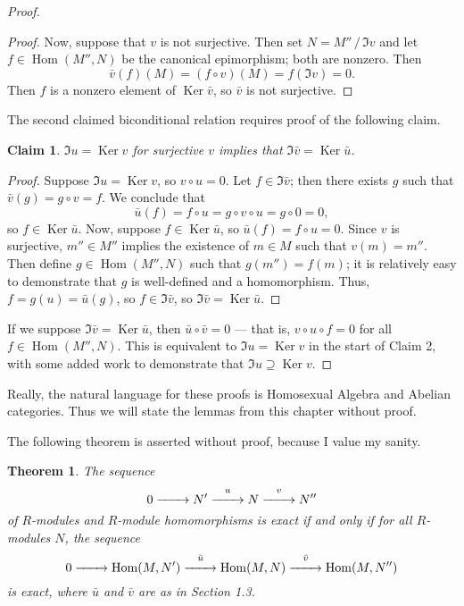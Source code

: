 \documentclass[11pt]{article}
\newtheorem{theorem}{Theorem}
\newtheorem{claim}{Claim}
\newcommand{\Hom}{\operatorname{Hom}}
\newcommand{\Ker}{\operatorname{Ker}}
\renewcommand{\longrightarrow}{\xrightarrow{\hspace*{0.7cm}}}
\begin{document}
\begin{adjustwidth}{0.5cm}{}
\begin{proof}
\begin{adjustwidth}{0.5cm}{}
\begin{proof}
				Now, suppose that $v$ is not surjective. Then set $N = M'' \,/\, \Im v$ and let $f \in \Hom(M'', N)$ be the canonical epimorphism; both are nonzero. Then
				\[
					\bar{v}(f)(M) = (f \circ v)(M) = f(\Im v) = 0.
				\]
				Then $f$ is a nonzero element of $\Ker \bar{v}$, so $\bar{v}$ is not surjective.
			\end{proof}
		\end{adjustwidth}
		The second claimed biconditional relation requires proof of the following claim.
		\begin{adjustwidth}{0.5cm}{}
			\begin{claim}
				$\Im u = \Ker v$ for surjective $v$ implies that $\Im \bar{v} = \Ker \bar{u}$.
			\end{claim}
			\begin{proof}\renewcommand{\qedsymbol}{}
				Suppose $\Im u = \Ker v$, so $v \circ u = 0$. Let $f \in \Im \bar{v}$; then there exists $g$ such that $\bar{v}(g) = g \circ v = f$. We conclude that
				\[
					\bar{u}(f) = f \circ u = g \circ v \circ u = g \circ 0 = 0,
				\]
				so $f \in \Ker \bar{u}$. Now, suppose $f \in \Ker \bar{u}$, so $\bar{u}(f) = f \circ u = 0$. Since $v$ is surjective, $m'' \in M''$ implies the existence of $m \in M$ such that $v(m) = m''$. Then define $g \in \Hom(M'', N)$ such that $g(m'') = f(m)$; it is relatively easy to demonstrate that $g$ is well-defined and a homomorphism. Thus, $f = g(u) = \bar{u}(g)$, so $f \in \Im \bar{v}$, so $\Im \bar{v} = \Ker \bar{u}$.
			\end{proof}
		\end{adjustwidth}
		If we suppose $\Im \bar{v} = \Ker \bar{u}$, then $\bar{u} \circ \bar{v} = 0$ --- that is, $v \circ u \circ f = 0$ for all $f \in \Hom(M'', N)$. This is equivalent to $\Im u = \Ker v$ in the start of Claim 2, with some added work to demonstrate that $\Im u \supseteq \Ker v$.
	\end{proof}
\end{adjustwidth}

Really, the natural language for these proofs is Homosexual Algebra and Abelian categories. Thus we will state the lemmas from this chapter without proof.

\newpage

The following theorem is asserted without proof, because I value my sanity.

\begin{adjustwidth}{0.5cm}{}
  \begin{theorem}
		The sequence
		\[
			0 \longrightarrow N' \stackrel{u}{\longrightarrow} N \stackrel{v}{\longrightarrow} N''
    \]
		of $R$-modules and $R$-module homomorphisms is exact if and only if for all $R$-modules $N$, the sequence
		\[
			0 \longrightarrow \Hom(M, N') \stackrel{\bar{u}}{\longrightarrow} \Hom(M, N) \stackrel{\bar{v}}{\longrightarrow} \Hom(M, N'')
    \]
		is exact, where $\bar{u}$ and $\bar{v}$ are as in Section 1.3.
  \end{theorem}
\end{adjustwidth}
\end{document}
